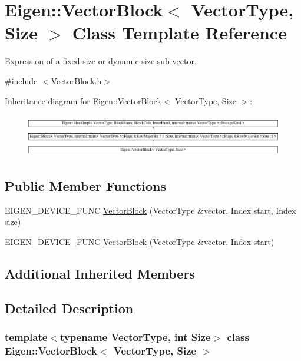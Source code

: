 \hypertarget{class_eigen_1_1_vector_block}{}\section{Eigen\+::Vector\+Block$<$ Vector\+Type, Size $>$ Class Template Reference}
\label{class_eigen_1_1_vector_block}


Expression of a fixed-\/size or dynamic-\/size sub-\/vector.  




{\ttfamily \#include $<$Vector\+Block.\+h$>$}

Inheritance diagram for Eigen\+::Vector\+Block$<$ Vector\+Type, Size $>$\+:\begin{figure}[H]
\begin{center}
\leavevmode
\includegraphics[height=1.902605cm]{class_eigen_1_1_vector_block}
\end{center}
\end{figure}
\subsection*{Public Member Functions}
\begin{DoxyCompactItemize}
\item 
E\+I\+G\+E\+N\+\_\+\+D\+E\+V\+I\+C\+E\+\_\+\+F\+U\+NC \mbox{\hyperlink{class_eigen_1_1_vector_block_a4bd5eb61b2c420218269a111d717dbb7}{Vector\+Block}} (Vector\+Type \&vector, Index start, Index size)
\item 
E\+I\+G\+E\+N\+\_\+\+D\+E\+V\+I\+C\+E\+\_\+\+F\+U\+NC \mbox{\hyperlink{class_eigen_1_1_vector_block_a94bcec1eda40d989b2fbcc70f343fa8f}{Vector\+Block}} (Vector\+Type \&vector, Index start)
\end{DoxyCompactItemize}
\subsection*{Additional Inherited Members}


\subsection{Detailed Description}
\subsubsection*{template$<$typename Vector\+Type, int Size$>$\newline
class Eigen\+::\+Vector\+Block$<$ Vector\+Type, Size $>$}

